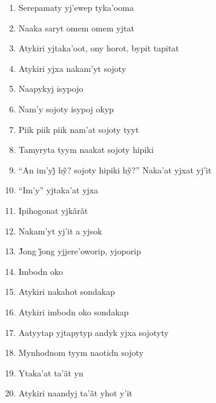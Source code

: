 \begin{enumerate}
 \item Serepamaty yj'ewep tyka'ooma

 \item Naaka saryt omem omem yjtat

 \item Atykiri yjtaka'oot, ony horot, bypit tapitat

 \begin{center}\end{center}

 \item Atykiri yjxa nakam'yt sojoty

 \item Naapykyj isypojo

 \item Nam'y sojoty isypoj okyp

 \item Piik piik piik nam'at sojoty tyyt

 \item Tamyryta tyym naakat sojoty hipiki

 \item ``An im’yj̃ hỹ? sojoty hipiki hỹ?'' Naka’at yjxat yj’it

 \item ``Im'y'' yjtaka'at yjxa

 \item Ipihogonat yjkãrãt

 \item Nakam'yt yj'it a yjsok

 \item J̃ong j̃ong yjjere’oworip, yjoporip

 \item Imbodn oko

 \item Atykiri nakahot sondakap

 \item Atykiri imbodn oko sondakap

 \item Aatyytap yjtapytyp andyk yjxa sojotyty

 \item Mynhodnom tyym naotidn sojoty

 \begin{center}\end{center}

 \item Ytaka'at ta'ãt yn

 \item Atykiri naandyj ta'ãt yhot y'it


\end{enumerate}
